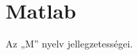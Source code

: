 \documentclass[../../main.tex]{subfiles}
\begin{document}
\section{Matlab}

\begin{fulltheorem}
	Az „M” nyelv jellegzetességei.
\end{fulltheorem}
\end{document}
